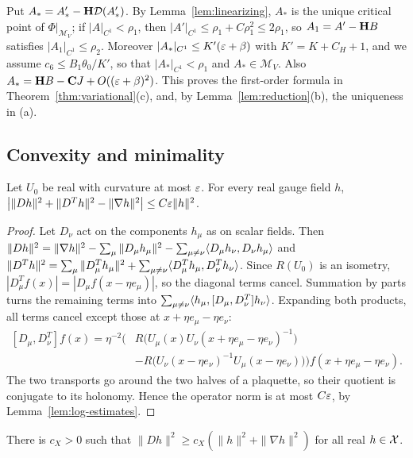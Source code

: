 Put $A_*=A'_*-\mathbf H\mathcal D(A'_*)$. By Lemma~\ref{lem:linearizing}, $A_*$ is the unique critical point of $\Phi|_{\mathcal M_V}$; if $|A|_{C^1}<\rho_1$, then $|A'|_{C^1}\le\rho_1+C\rho_1^2\le2\rho_1$, so $A_1=A'-\mathbf H B$ satisfies $|A_1|_{C^1}\le\rho_2$. Moreover $|A_*|_{C^1}\le K'(\varepsilon+\beta)$ with $K'=K+C_H+1$, and we assume $c_6\le B_1\theta_0/K'$, so that $|A_*|_{C^1}<\rho_1$ and $A_*\in\mathcal M_V$. Also $A_*=\mathbf H B-\mathbf C J+O((\varepsilon+\beta)^2)$. This proves the first-order formula in Theorem~\ref{thm:variational}(c), and, by Lemma~\ref{lem:reduction}(b), the uniqueness in (a).

\subsection{Convexity and minimality}

\begin{lemma}\label{lem:weitzenbock}
Let $U_0$ be real with curvature at most $\varepsilon$. For every real gauge field $h$, $\big|\|Dh\|^2+\|D^Th\|^2-\|\nabla h\|^2\big|\le C\varepsilon\|h\|^2$.
\end{lemma}

\begin{proof}
Let $D_\nu$ act on the components $h_\mu$ as on scalar fields. Then $\|Dh\|^2=\|\nabla h\|^2-\sum_\mu\|D_\mu h_\mu\|^2-\sum_{\mu\ne\nu}\langle D_\mu h_\nu,D_\nu h_\mu\rangle$ and $\|D^Th\|^2=\sum_\mu\|D^T_\mu h_\mu\|^2+\sum_{\mu\ne\nu}\langle D^T_\mu h_\mu,D^T_\nu h_\nu\rangle$. Since $R(U_0)$ is an isometry, $|D^T_\mu f(x)|=|D_\mu f(x-\eta e_\mu)|$, so the diagonal terms cancel. Summation by parts turns the remaining terms into $\sum_{\mu\ne\nu}\langle h_\mu,[D_\mu,D^T_\nu]h_\nu\rangle$. Expanding both products, all terms cancel except those at $x+\eta e_\mu-\eta e_\nu$:
\[
\begin{aligned}
[D_\mu,D^T_\nu]f(x)=\eta^{-2}\Big(&R\big(U_\mu(x)U_\nu(x+\eta e_\mu-\eta e_\nu)^{-1}\big)\\
&-R\big(U_\nu(x-\eta e_\nu)^{-1}U_\mu(x-\eta e_\nu)\big)\Big)f(x+\eta e_\mu-\eta e_\nu).
\end{aligned}
\]
The two transports go around the two halves of a plaquette, so their quotient is conjugate to its holonomy. Hence the operator norm is at most $C\varepsilon$, by Lemma~\ref{lem:log-estimates}.
\end{proof}

\begin{lemma}\label{lem:X-coercive}
There is $c_X>0$ such that $\|Dh\|^2\ge c_X(\|h\|^2+\|\nabla h\|^2)$ for all real $h\in\mathcal X$.
\end{lemma}

